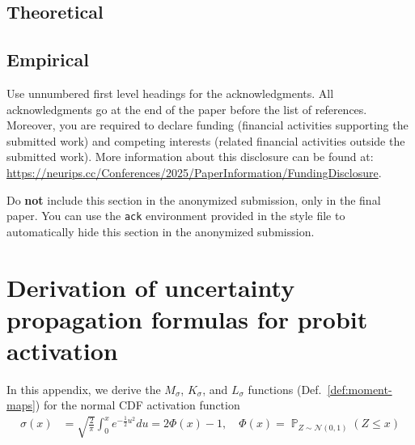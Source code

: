 \documentclass{article}
\DeclareMathOperator{\probability}{\mathbb{P}}
\begin{document}
\subsection{Theoretical}

\subsection{Empirical}

\begin{ack}
Use unnumbered first level headings for the acknowledgments. All acknowledgments
go at the end of the paper before the list of references. Moreover, you are required to declare
funding (financial activities supporting the submitted work) and competing interests (related financial activities outside the submitted work).
More information about this disclosure can be found at: \url{https://neurips.cc/Conferences/2025/PaperInformation/FundingDisclosure}.


Do {\bf not} include this section in the anonymized submission, only in the final paper. You can use the \texttt{ack} environment provided in the style file to automatically hide this section in the anonymized submission.
\end{ack}






\appendix
\clearpage
\tableofcontents
\clearpage
\section{Derivation of uncertainty propagation formulas for probit activation}
\label{app:probit}
In this appendix, we derive the \(M_\sigma\), \(K_\sigma\), and
\(L_\sigma\) functions (Def.~\ref{def:moment-maps}) for the normal
CDF activation function
\begin{align}
  \sigma(x) &= \sqrt{\frac{2}{\pi}} \int_{0}^x e^{-\frac{1}{2} u^2}
  du = 2 \Phi(x) - 1, \quad \Phi(x) = \probability_{Z \sim \mathcal
  N(0, 1)}(Z \leq x)
  \label{eq:activation}
\end{align}
\end{document}
